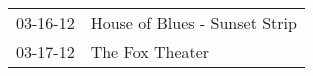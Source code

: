 \begin{supertabular}{p{0.25\columnwidth}p{0.75\columnwidth}}
 03-16-12 &  House of Blues - Sunset Strip \\
 03-17-12 &                The Fox Theater \\
\end{supertabular}
